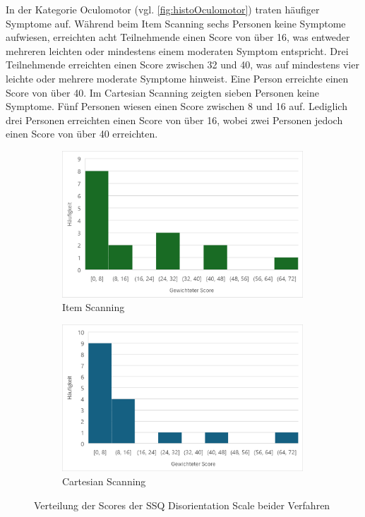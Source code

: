 In der Kategorie Oculomotor (vgl. \autoref{fig:histoOculomotor}) traten häufiger Symptome auf. Während beim Item Scanning sechs Personen keine Symptome aufwiesen, erreichten acht Teilnehmende einen Score von über 16, was entweder mehreren leichten oder mindestens einem moderaten Symptom entspricht. Drei Teilnehmende erreichten einen Score zwischen 32 und 40, was auf mindestens vier leichte oder mehrere moderate Symptome hinweist. Eine Person erreichte einen Score von über 40.
Im Cartesian Scanning zeigten sieben Personen keine Symptome. Fünf Personen wiesen einen Score zwischen 8 und 16 auf. Lediglich drei Personen erreichten einen Score von über 16, wobei zwei Personen jedoch einen Score von über 40 erreichten. 

\begin{figure}
    \centering
    \begin{subfigure}{.5\textwidth}
        \centering
        \includegraphics[width=0.99\textwidth]{images/Results/Histogramm-Disorientation-Scale-Item.png}
        \caption{Item Scanning}
        \label{fig:histoDisorientationItem}   
    \end{subfigure}%
    \begin{subfigure}{.5\textwidth}
        \centering
        \includegraphics[width=0.99\textwidth]{images/Results/Histogramm-Disorientation-Scale-Cartesian.png}
         \caption{Cartesian Scanning}
         \label{fig:histoDisorientationCartesian}
    \end{subfigure}
    \caption{Verteilung der Scores der SSQ Disorientation Scale beider Verfahren}
    \label{fig:histoDisorientation}
\end{figure}

